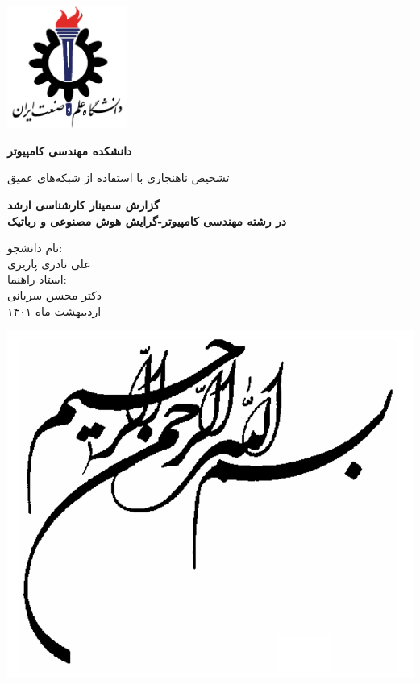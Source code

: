 \documentclass[12pt,a4paper]{report}
\theoremstyle{definition}
\theoremstyle{definition}
\begin{document}
	\thispagestyle{empty}
	\vspace*{25mm}
	\centerline{\includegraphics[height=4cm]{./images/logos/iust.png}}

	\begin{center}
	\textbf{
		دانشکده مهندسی کامپیوتر
	}
	\\[1cm]
	\baselineskip=2cm
	{\titr
	\begin{Huge}
	تشخیص ناهنجاری با استفاده از شبکه‌های عمیق\\[1cm]
	\end{Huge}}
	{\Large 
		\textbf{
			گزارش سمینار کارشناسی ارشد\\
			در رشته مهندسی کامپیوتر-گرایش هوش مصنوعی و رباتیک
		} \\[1cm]
	}

	{\Large { 
	نام دانشجو:
	}
	\\
	{\Large  علی نادری پاریزی }
	\\[.5cm]
	{\Large  
		استاد راهنما:
	}
	\\
	{\Large دکتر محسن سریانی}
	\\[.6cm]
	}
	اردیبهشت ماه ۱۴۰۱
	\end{center}

	\newpage
		\begin{center}
		\includegraphics[width=\linewidth]{./images/god.png}
		\end{center}
	\newpage
	
\end{document}
